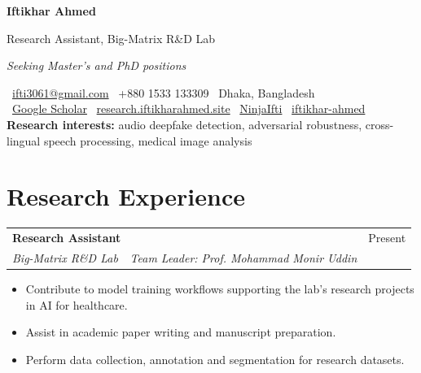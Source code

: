 \documentclass[a4paper,10pt]{article}
\makeatletter
\newcommand{\entry}[4]{%
  \begin{tabularx}{\linewidth}{@{}X r@{}}
    \textbf{#1} & #2 \\
    \textit{\small #3} & {\small\color{muted}#4} \\
  \end{tabularx}\par\vspace{1pt}}
\newenvironment{tight}{\begin{itemize}[leftmargin=1.1em, itemsep=0pt, parsep=0pt, topsep=2pt, partopsep=0pt, label={\textbullet}]\small}{\end{itemize}}
\makeatother
\begin{document}
\begin{center}
  {\fontsize{24}{28}\selectfont\bfseries Iftikhar Ahmed}\par\vspace{4pt}
  {\large Research Assistant, Big-Matrix R\&D Lab}\par\vspace{1pt}
  {\itshape Seeking Master's and PhD positions}\par\vspace{5pt}
  \small
  \faEnvelope\ \href{mailto:ifti3061@gmail.com}{ifti3061@gmail.com} \quad
  \faPhone*\ +880 1533 133309 \quad
  \faMapMarker*\ Dhaka, Bangladesh \\[2pt]
  \faGraduationCap\ \href{https://scholar.google.com/citations?user=Y6oHZxgAAAAJ&hl=en}{Google Scholar} \quad
  \faGlobe\ \href{https://research.iftikharahmed.site/}{research.iftikharahmed.site} \quad
  \faGithub\ \href{https://github.com/NinjaIfti}{NinjaIfti} \quad
  \faLinkedin\ \href{https://www.linkedin.com/in/iftikhar-ahmed-223329339/}{iftikhar-ahmed} \\[5pt]
  \textbf{Research interests:} audio deepfake detection, adversarial robustness, cross-lingual speech processing, medical image analysis
\end{center}

\section{Research Experience}
\entry{Research Assistant}{Present}
{Big-Matrix R\&D Lab \,\textperiodcentered\, Team Leader: Prof. Mohammad Monir Uddin}{}
\vspace{-4pt}
\begin{tight}
  \item Contribute to model training workflows supporting the lab's research projects in AI for healthcare.
  \item Assist in academic paper writing and manuscript preparation.
  \item Perform data collection, annotation and segmentation for research datasets.
\end{tight}

\end{document}
